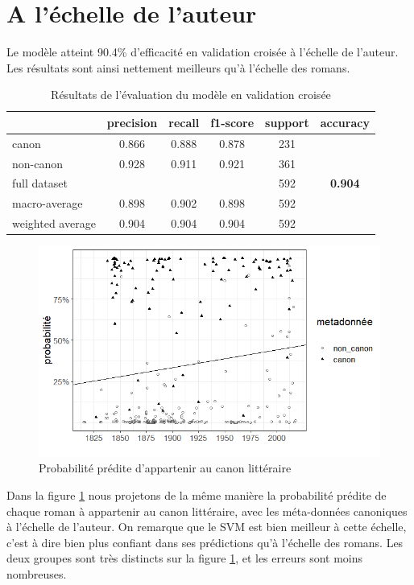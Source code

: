 \section{A l'échelle de l'auteur}

Le modèle atteint 90.4\% d'efficacité en validation croisée à l'échelle de l'auteur. Les résultats sont ainsi nettement meilleurs qu'à l'échelle des romans. 
	\begin{table}[ht]
		\centering %
		\begin{tabular}{l c c c c c}
			\toprule
    			 & precision & recall & f1-score & support & accuracy \\
			\toprule
			canon & 0.866 & 0.888 & 0.878 & 231 \\
			\midrule
			non-canon & 0.928 & 0.911 & 0.921 & 361 \\
			\midrule
			full dataset & & & & 592 & \textbf{0.904}\\
			\midrule
			macro-average & 0.898 & 0.902 & 0.898 & 592 \\
			\midrule
			weighted average & 0.904 & 0.904 & 0.904 & 592 \\

			\bottomrule
		\end{tabular}
	\caption{Résultats de l'évaluation du modèle en validation croisée}
	\end{table} 

\bigskip
\begin{figure}[!ht]
    \centering
    \includegraphics[width=15cm]{img/09_fabula_visual_svm.png}
    \caption{Probabilité prédite d'appartenir au canon littéraire}
    \label{svm_author}
\end{figure}


Dans la figure \ref{svm_author} nous projetons de la même manière la probabilité prédite de chaque roman à appartenir au canon littéraire, avec les méta-données canoniques à l'échelle de l'auteur. On remarque que le SVM est bien meilleur à cette échelle, c'est à dire bien plus confiant dans ses prédictions qu'à l'échelle des romans. Les deux groupes sont très distincts sur la figure \ref{svm_author}, et les erreurs sont moins nombreuses.   



